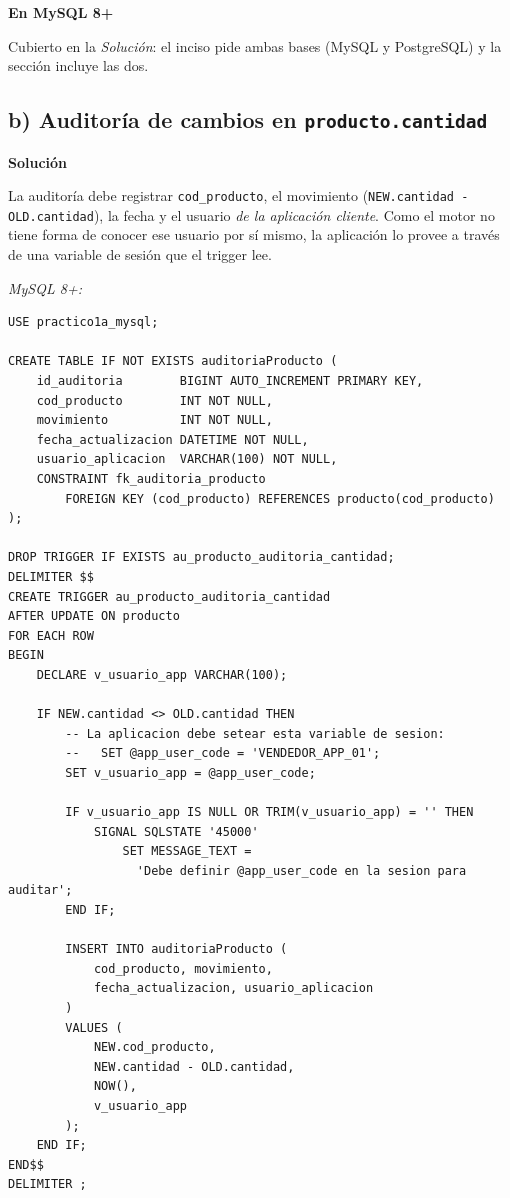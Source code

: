 \documentclass[11pt,a4paper]{article}
\newcommand{\itemcabecera}[1]{\noindent\textbf{#1}\par\medskip}
\newcommand{\bloqueSolucion}{\itemcabecera{Soluci\'on}}
\newcommand{\bloqueMySQL}{\itemcabecera{En MySQL 8+}}
\begin{document}
\bloqueMySQL

Cubierto en la \textit{Solución}: el inciso pide ambas bases (MySQL y PostgreSQL) y la sección incluye las dos.

\subsection{b) Auditoría de cambios en \texttt{producto.cantidad}}

\bloqueSolucion

La auditoría debe registrar \texttt{cod\_producto}, el movimiento (\texttt{NEW.cantidad - OLD.cantidad}), la fecha y el usuario \emph{de la aplicación cliente}. Como el motor no tiene forma de conocer ese usuario por sí mismo, la aplicación lo provee a través de una variable de sesión que el trigger lee.

\textit{MySQL 8+:}

\begin{lstlisting}
USE practico1a_mysql;

CREATE TABLE IF NOT EXISTS auditoriaProducto (
    id_auditoria        BIGINT AUTO_INCREMENT PRIMARY KEY,
    cod_producto        INT NOT NULL,
    movimiento          INT NOT NULL,
    fecha_actualizacion DATETIME NOT NULL,
    usuario_aplicacion  VARCHAR(100) NOT NULL,
    CONSTRAINT fk_auditoria_producto
        FOREIGN KEY (cod_producto) REFERENCES producto(cod_producto)
);

DROP TRIGGER IF EXISTS au_producto_auditoria_cantidad;
DELIMITER $$
CREATE TRIGGER au_producto_auditoria_cantidad
AFTER UPDATE ON producto
FOR EACH ROW
BEGIN
    DECLARE v_usuario_app VARCHAR(100);

    IF NEW.cantidad <> OLD.cantidad THEN
        -- La aplicacion debe setear esta variable de sesion:
        --   SET @app_user_code = 'VENDEDOR_APP_01';
        SET v_usuario_app = @app_user_code;

        IF v_usuario_app IS NULL OR TRIM(v_usuario_app) = '' THEN
            SIGNAL SQLSTATE '45000'
                SET MESSAGE_TEXT =
                  'Debe definir @app_user_code en la sesion para auditar';
        END IF;

        INSERT INTO auditoriaProducto (
            cod_producto, movimiento,
            fecha_actualizacion, usuario_aplicacion
        )
        VALUES (
            NEW.cod_producto,
            NEW.cantidad - OLD.cantidad,
            NOW(),
            v_usuario_app
        );
    END IF;
END$$
DELIMITER ;
\end{lstlisting}
\end{document}
